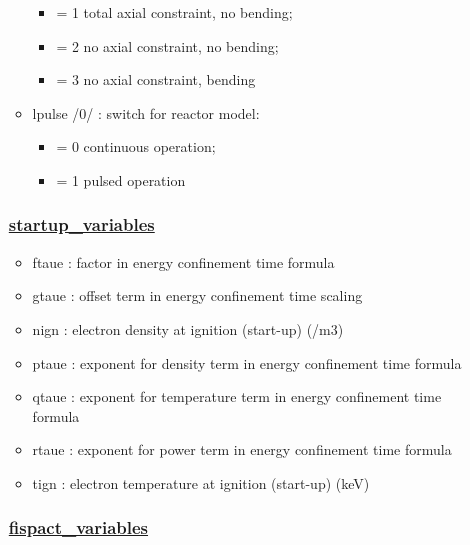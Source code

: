 \documentclass[
]{article}
\providecommand{\tightlist}{%
  \setlength{\itemsep}{0pt}\setlength{\parskip}{0pt}}
\begin{document}
\begin{itemize}
\begin{itemize}
    \begin{itemize}
    \tightlist
    \item
      = 1 total axial constraint, no bending;
    \item
      = 2 no axial constraint, no bending;
    \item
      = 3 no axial constraint, bending
    \end{itemize}
  \item
    lpulse /0/ : switch for reactor model:

    \begin{itemize}
    \tightlist
    \item
      = 0 continuous operation;
    \item
      = 1 pulsed operation
    \end{itemize}
  \end{itemize}

  \hypertarget{startup_variables}{%
  \subsubsection{\texorpdfstring{\href{startup_variables.html}{startup\_variables}}{startup\_variables}}\label{startup_variables}}

  \begin{itemize}
  \tightlist
  \item
    ftaue : factor in energy confinement time formula
  \item
    gtaue : offset term in energy confinement time scaling
  \item
    nign : electron density at ignition (start-up) (/m3)
  \item
    ptaue : exponent for density term in energy confinement time formula
  \item
    qtaue : exponent for temperature term in energy confinement time
    formula
  \item
    rtaue : exponent for power term in energy confinement time formula
  \item
    tign : electron temperature at ignition (start-up) (keV)
  \end{itemize}

  \hypertarget{fispact_variables}{%
  \subsubsection{\texorpdfstring{\href{fispact_variables.html}{fispact\_variables}}{fispact\_variables}}\label{fispact_variables}}


\end{itemize}
\end{document}
